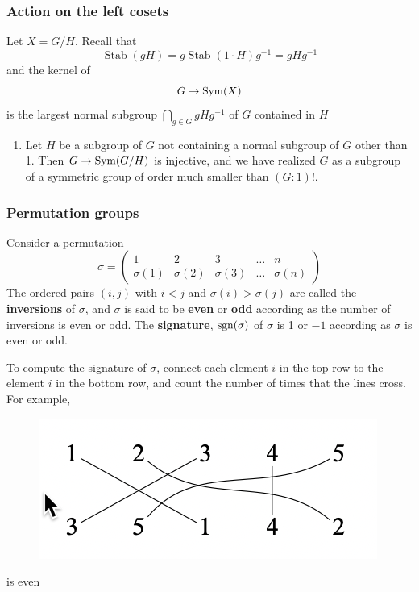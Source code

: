 \documentclass[11pt]{article}
\DeclareMathOperator{\Stab}{Stab}
\begin{document}
\subsubsection{Action on the left cosets}
\label{sec:org596c064}
Let \(X=G/H\). Recall that
\begin{equation*}
\Stab(gH)=g\Stab(1\cdot H)g^{-1}=gHg^{-1}
\end{equation*}
and the kernel of
\begin{equation*}
G\to\operatorname{Sym}(X)
\end{equation*}
is the largest normal subgroup \(\bigcap_{g\in G}gHg^{-1}\) of \(G\) contained in \(H\)

\begin{remark}
\begin{enumerate}
\item Let \(H\) be a subgroup of \(G\) not containing a normal subgroup of \(G\) other than 1.
Then \(G\to\operatorname{Sym}(G/H)\) is injective, and we have realized \(G\) as a subgroup of a symmetric
group of order much smaller than \((G:1)!\).
\end{enumerate}
\end{remark}

\label{SKIP3}
\subsubsection{Permutation groups}
\label{sec:org0bbfb4c}
Consider a permutation
\begin{equation*}
\sigma=
\begin{pmatrix}
1&2&3&\dots&n\\
\sigma(1)&\sigma(2)&\sigma(3)&\dots&\sigma(n)
\end{pmatrix}
\end{equation*}
The ordered pairs \((i,j)\) with \(i<j\) and \(\sigma(i)>\sigma(j)\) are called the \textbf{inversions} of \(\sigma\), and
\(\sigma\) is said to be \textbf{even} or \textbf{odd} according as the number of inversions is even or odd. The
\textbf{signature}, \(\operatorname{sgn}(\sigma)\) of \(\sigma\) is 1 or \(-1\) according as \(\sigma\) is even or odd.

\begin{remark}
To compute the signature of \(\sigma\), connect each element \(i\) in the top row to the element \(i\) in
the bottom row, and count the number of times that the lines cross. For example,
\begin{figure}[htbp]
\centering
\includegraphics[width=.4\textwidth]{../images/GroupTheory/2.png}
\label{}
\end{figure}
is even
\end{remark}
\end{document}
